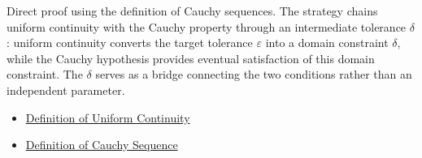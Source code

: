 \begin{remark*}
Direct proof using the definition of Cauchy sequences. The strategy chains uniform continuity with the Cauchy property through an intermediate tolerance $\delta$: uniform continuity converts the target tolerance $\varepsilon$ into a domain constraint $\delta$, while the Cauchy hypothesis provides eventual satisfaction of this domain constraint. The $\delta$ serves as a bridge connecting the two conditions rather than an independent parameter.
\end{remark*}

\begin{dependencies}
\begin{itemize}
  \item \hyperref[def:uniform-continuity]{Definition of Uniform Continuity}
  \item \hyperref[def:cauchy-sequence]{Definition of Cauchy Sequence}
\end{itemize}
\end{dependencies}

\clearpage
